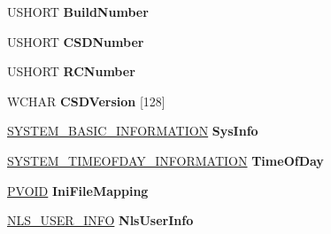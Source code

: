 \begin{DoxyCompactItemize}
\mbox{\label{struct___b_a_s_e___s_t_a_t_i_c___s_e_r_v_e_r___d_a_t_a_aee68cd7858339bed2b7f121f5111e115}} 
U\+S\+H\+O\+RT {\bfseries Build\+Number}
\item 
\mbox{\label{struct___b_a_s_e___s_t_a_t_i_c___s_e_r_v_e_r___d_a_t_a_acbd47799d6b00a5fb584203c1beb6e41}} 
U\+S\+H\+O\+RT {\bfseries C\+S\+D\+Number}
\item 
\mbox{\label{struct___b_a_s_e___s_t_a_t_i_c___s_e_r_v_e_r___d_a_t_a_a7b54b5d1f15badcab51bfbf2980fd540}} 
U\+S\+H\+O\+RT {\bfseries R\+C\+Number}
\item 
\mbox{\label{struct___b_a_s_e___s_t_a_t_i_c___s_e_r_v_e_r___d_a_t_a_ac30495acc59fdae95c8856099e4750f1}} 
W\+C\+H\+AR {\bfseries C\+S\+D\+Version} \mbox{[}128\mbox{]}
\item 
\mbox{\label{struct___b_a_s_e___s_t_a_t_i_c___s_e_r_v_e_r___d_a_t_a_aa8e021b6aba8d78dd2cf8f8a063c353a}} 
\hyperlink{struct___s_y_s_t_e_m___b_a_s_i_c___i_n_f_o_r_m_a_t_i_o_n}{S\+Y\+S\+T\+E\+M\+\_\+\+B\+A\+S\+I\+C\+\_\+\+I\+N\+F\+O\+R\+M\+A\+T\+I\+ON} {\bfseries Sys\+Info}
\item 
\mbox{\label{struct___b_a_s_e___s_t_a_t_i_c___s_e_r_v_e_r___d_a_t_a_a7d4afc71fca25cfdcdbbffe26c12c492}} 
\hyperlink{struct___s_y_s_t_e_m___t_i_m_e_o_f_d_a_y___i_n_f_o_r_m_a_t_i_o_n}{S\+Y\+S\+T\+E\+M\+\_\+\+T\+I\+M\+E\+O\+F\+D\+A\+Y\+\_\+\+I\+N\+F\+O\+R\+M\+A\+T\+I\+ON} {\bfseries Time\+Of\+Day}
\item 
\mbox{\label{struct___b_a_s_e___s_t_a_t_i_c___s_e_r_v_e_r___d_a_t_a_aa0324ad9f26b8ad5e034bd3e5db2ee96}} 
\hyperlink{interfacevoid}{P\+V\+O\+ID} {\bfseries Ini\+File\+Mapping}
\item 
\mbox{\label{struct___b_a_s_e___s_t_a_t_i_c___s_e_r_v_e_r___d_a_t_a_a1061fb595c3e89dc63af1e071dd6ed32}} 
\hyperlink{struct___n_l_s___u_s_e_r___i_n_f_o}{N\+L\+S\+\_\+\+U\+S\+E\+R\+\_\+\+I\+N\+FO} {\bfseries Nls\+User\+Info}

\end{DoxyCompactItemize}
